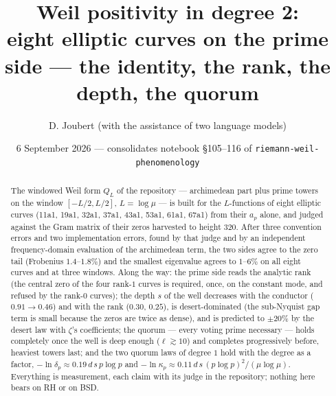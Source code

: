 \documentclass[11pt]{article}
\title{Weil positivity in degree 2:\\ \large eight elliptic curves on the prime side --- the identity, the rank, the depth, the quorum}
\author{D. Joubert (with the assistance of two language models)}
\date{6 September 2026 --- consolidates notebook \S105--116 of \texttt{riemann-weil-phenomenology}}
\begin{document}
\maketitle
\begin{abstract}
The windowed Weil form $Q_L$ of the repository --- archimedean part plus prime towers on the window $[-L/2,L/2]$, $L=\log\mu$ --- is built for the $L$-functions of eight elliptic curves (11a1, 19a1, 32a1, 37a1, 43a1, 53a1, 61a1, 67a1) from their $a_p$ alone, and judged against the Gram matrix of their zeros harvested to height $320$. After three convention errors and two implementation errors, found by that judge and by an independent frequency-domain evaluation of the archimedean term, the two sides agree to the zero tail (Frobenius $1.4$--$1.8\%$) and the smallest eigenvalue agrees to $1$--$6\%$ on all eight curves and at three windows. Along the way: the prime side reads the analytic rank (the central zero of the four rank-$1$ curves is required, once, on the constant mode, and refused by the rank-$0$ curves); the depth $s$ of the well decreases with the conductor ($0.91\to0.46$) and with the rank ($0.30$, $0.25$), is desert-dominated (the sub-Nyquist gap term is small because the zeros are twice as dense), and is predicted to $\pm20\%$ by the desert law with $\zeta$'s coefficients; the quorum --- every voting prime necessary --- holds completely once the well is deep enough ($\ell\gtrsim10$) and completes progressively before, heaviest towers last; and the two quorum laws of degree $1$ hold with the degree as a factor, $-\ln\delta_p\approx0.19\,d\,s\,p\log p$ and $-\ln\kappa_p\approx0.11\,d\,s\,(p\log p)^2/(\mu\log\mu)$. Everything is measurement, each claim with its judge in the repository; nothing here bears on RH or on BSD.
\end{abstract}
\end{document}
